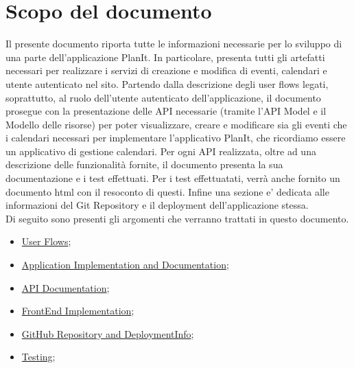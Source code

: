\section*{Scopo del documento}

Il presente documento riporta tutte le informazioni necessarie per lo sviluppo di una parte dell'applicazione PlanIt. In particolare, presenta tutti gli artefatti necessari per realizzare i servizi di creazione e modifica di eventi, calendari e utente autenticato nel sito.
Partendo dalla descrizione degli user flows legati, soprattutto, al ruolo dell'utente autenticato dell'applicazione, il documento prosegue con la presentazione delle API necessarie (tramite l'API Model e il Modello delle risorse) per poter visualizzare, creare e modificare sia gli eventi che i calendari necessari per implementare l'applicativo PlanIt, che ricordiamo essere un applicativo di gestione calendari.
Per ogni API realizzata, oltre ad una descrizione delle funzionalità fornite, il documento presenta la sua documentazione e i test effettuati. Per i test effettuatati, verrà anche fornito un documento html con il resoconto di questi. Infine una sezione e' dedicata alle informazioni del Git Repository e il deployment dell'applicazione stessa. \\ Di seguito sono presenti gli argomenti che verranno trattati in questo documento.

\begin{itemize}
    \item \hyperref[secD4:UserFlows]{User Flows};
    \item \hyperref[secD4:ApplicationImplementationAndDocumentation]{Application Implementation and Documentation};
    \item \hyperref[secD4:APIDocumentation]{API Documentation};
    \item \hyperref[secD4:FrontEndImplementation]{FrontEnd Implementation};
    \item \hyperref[secD4:GitHubRepositoryAndDeploymentInfo]{GitHub Repository and DeploymentInfo};
    \item \hyperref[secD4:Testing]{Testing};
\end{itemize}

